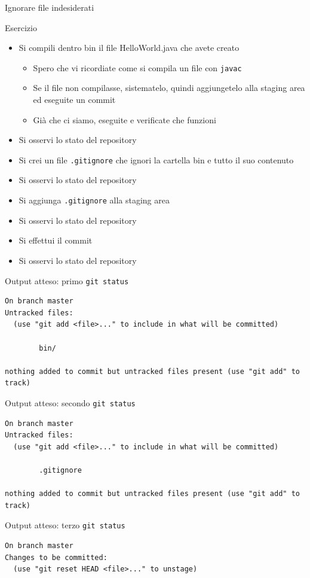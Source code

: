 \documentclass[xcolor=dvipsnames,presentation]{beamer}
\begin{document}
\begin{frame}{Ignorare file indesiderati}
	\begin{block}{Esercizio}
		\begin{itemize}
			\item Si compili dentro bin il file HelloWorld.java che avete creato
			\begin{itemize}
				\item Spero che vi ricordiate come si compila un file con \texttt{javac}
				\item Se il file non compilasse, sistematelo, quindi aggiungetelo alla staging area
ed eseguite un commit
				\item Già che ci siamo, eseguite e verificate che funzioni
			\end{itemize}
			\item Si osservi lo stato del repository
			\item Si crei un file \texttt{.gitignore} che ignori la cartella bin e tutto il suo
contenuto
			\item Si osservi lo stato del repository
			\item Si aggiunga \texttt{.gitignore} alla staging area
			\item Si osservi lo stato del repository
			\item Si effettui il commit
			\item Si osservi lo stato del repository
		\end{itemize}
	\end{block}
	\begin{block}{Output atteso: primo \texttt{git status}}
		\begin{Verbatim}[fontsize=\scriptsize]
On branch master
Untracked files:
  (use "git add <file>..." to include in what will be committed)

        bin/

nothing added to commit but untracked files present (use "git add" to track)
		\end{Verbatim}
	\end{block}
	\begin{block}{Output atteso: secondo \texttt{git status}}
		\begin{Verbatim}[fontsize=\scriptsize]
On branch master
Untracked files:
  (use "git add <file>..." to include in what will be committed)

        .gitignore

nothing added to commit but untracked files present (use "git add" to track)
		\end{Verbatim}
	\end{block}
	\begin{block}{Output atteso: terzo \texttt{git status}}
		\begin{Verbatim}[fontsize=\scriptsize]
On branch master
Changes to be committed:
  (use "git reset HEAD <file>..." to unstage)


\end{Verbatim}
\end{block}
\end{frame}
\end{document}
